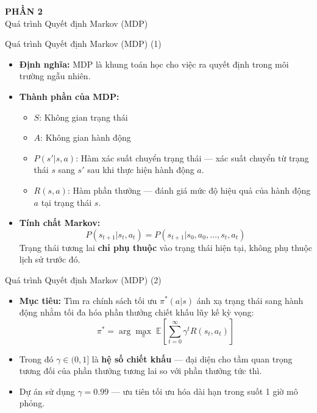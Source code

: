 
\begin{frame}
  \centering
  \Huge \textbf{PHẦN 2} \\[0.5cm]
  \LARGE Quá trình Quyết định Markov (MDP)
\end{frame}

\begin{frame}{Quá trình Quyết định Markov (MDP) (1)}
\begin{itemize}
    \item \textbf{Định nghĩa:} MDP là khung toán học cho việc ra quyết định trong môi trường ngẫu nhiên.
    \item \textbf{Thành phần của MDP:}
    \begin{itemize}
        \item $S$: Không gian trạng thái
        \item $A$: Không gian hành động
        \item $P(s'|s,a)$: Hàm xác suất chuyển trạng thái — xác suất chuyển từ trạng thái $s$ sang $s'$ sau khi thực hiện hành động $a$.
        \item $R(s,a)$: Hàm phần thưởng — đánh giá mức độ hiệu quả của hành động $a$ tại trạng thái $s$.
    \end{itemize}
    \item \textbf{Tính chất Markov:}
    \[
    P(s_{t+1} | s_t, a_t) = P(s_{t+1} | s_0, a_0, \ldots, s_t, a_t)
    \]
    Trạng thái tương lai \textbf{chỉ phụ thuộc} vào trạng thái hiện tại, không phụ thuộc lịch sử trước đó.
\end{itemize}
\end{frame}

\begin{frame}{Quá trình Quyết định Markov (MDP) (2)}
\begin{itemize}
    \item \textbf{Mục tiêu:} Tìm ra chính sách tối ưu $\pi^*(a|s)$ ánh xạ trạng thái sang hành động nhằm tối đa hóa phần thưởng chiết khấu lũy kế kỳ vọng:
    \[
    \pi^* = \arg\max_\pi\; \mathbb{E}\left[\sum_{t=0}^{\infty} \gamma^t R(s_t, a_t)\right]
    \]
    \item Trong đó $\gamma \in (0,1]$ là \textbf{hệ số chiết khấu} — đại diện cho tầm quan trọng tương đối của phần thưởng tương lai so với phần thưởng tức thì.
    \item Dự án sử dụng $\gamma = 0.99$ — ưu tiên tối ưu hóa dài hạn trong suốt 1 giờ mô phỏng.
\end{itemize}
\end{frame}

